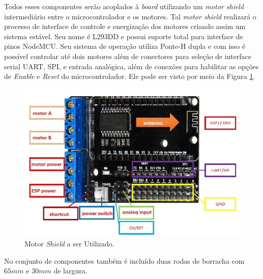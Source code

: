 \documentclass[portugues, brazil, a4paper,12pt]{article}
\begin{document}
			Todos esses componentes serão acoplados à \textit{board} utilizando um \textit{motor shield} intermediário entre o microcontrolador e os motores. Tal \textit{motor shield} realizará o processo de interface de controle e energização dos motores criando assim um sistema estável. Seu nome é L293DD e possui suporte total para interface de pinos NodeMCU. Seu sistema de operação utiliza Ponte-H dupla e com isso é possível controlar até dois motores além de conectores para seleção de interface serial UART, SPI, e entrada analógica, além de conexões para habilitar as opções de \textit{Enable} e \textit{Reset} do microcontrolador. Ele pode ser visto por meio da Figura \ref{fig:eq-motor_shield}.

			\begin{figure}[h]
				\centering
				\includegraphics[width=0.9\linewidth]{img/elementos-motor_shield.jpg}
				\caption{Motor \textit{Shield} a ser Utilizado.}
				\label{fig:eq-motor_shield}
			\end{figure}

			No conjunto de componentes também é incluído duas rodas de borracha com $65mm$ e $30mm$ de largura.
\end{document}
